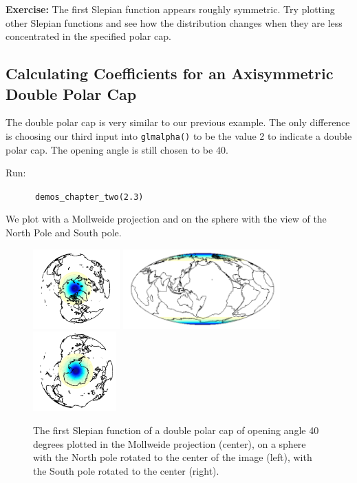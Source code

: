 \documentclass[11pt]{article}
\begin{document}
\textbf{Exercise:} The first Slepian function appears roughly symmetric. Try plotting other Slepian functions and see how the distribution changes when they are less concentrated in the specified polar cap.

\subsection{Calculating Coefficients for an Axisymmetric Double Polar Cap}

The double polar cap is very similar to our previous example. The only difference is choosing our third input into \verb|glmalpha()| to be the value 2 to indicate a double polar cap. The opening angle is still chosen to be 40. 

Run:

\verb|		demos_chapter_two(2.3)|

We plot with a Mollweide projection and on the sphere with the view of the North Pole and South pole. 

\begin{figure}[H]
  \centering
  \includegraphics[height=1.2in]{figures/figure3B.png}
  \includegraphics[height=1.2in]{figures/figure3A.png}
  \includegraphics[height=1.2in]{figures/figure3C.png}
  \caption{The first Slepian function of a double polar cap of opening angle 40 degrees plotted in the Mollweide projection (center), on a sphere with the North pole rotated to the center of the image (left), with the South pole rotated to the center (right).}
   \label{figure3}
\end{figure}
\end{document}
